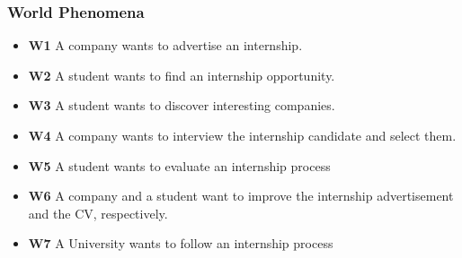 \documentclass{article}
\begin{document}
\subsubsection{World Phenomena}
    \begin{itemize}
        \item \textbf{W1} A company wants to advertise an internship. 
        \item \textbf{W2} A student wants to find an internship opportunity.
        \item \textbf{W3} A student wants to discover interesting companies.
        \item \textbf{W4} A company wants to interview the internship candidate and select them.
        \item \textbf{W5} A student wants to evaluate an internship process
        \item \textbf{W6} A company and a student want to improve the internship advertisement and the CV, respectively.
        \item \textbf{W7} A University wants to follow an internship process
    \end{itemize}
\end{document}
